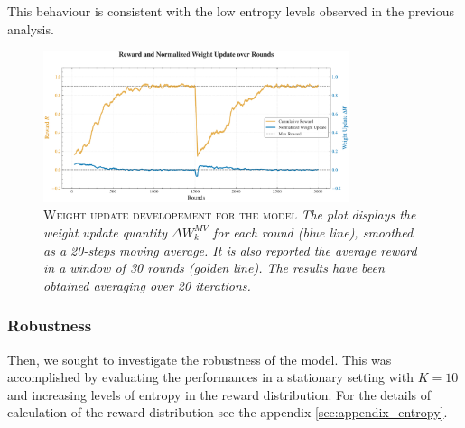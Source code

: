 This behaviour is consistent with the low entropy levels observed in the previous analysis.


\begin{figure}[H]
    \centering
    \includegraphics[width=0.8\textwidth]{figures/reward_update_plot.pdf}
    \caption{\textsc{Weight update developement for the model} \textit{The plot displays the weight update quantity $\Delta W_{k}^{MV}$ for each round (blue line), smoothed as a 20-steps moving average.
    It is also reported the average reward in a window of 30 rounds (golden line). The results have been obtained averaging over 20 iterations.}}
    \label{fig:rew_update}
\end{figure}


\subsubsection{Robustness}

\noindent Then, we sought to investigate the robustness of the model.
This was accomplished by evaluating the performances in a stationary setting with $K=10$ and increasing levels of entropy in the reward distribution. For the details of calculation of the reward distribution see the appendix \ref{sec:appendix_entropy}.

